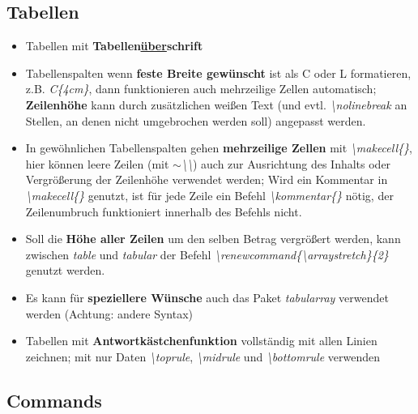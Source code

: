 \documentclass[./main.tex]{subfiles}
\begin{document}
\subsection{Tabellen}
\begin{itemize}
    \item Tabellen mit \textbf{Tabellen\underline{\"uber}schrift}
    \item Tabellenspalten wenn \textbf{feste Breite gew\"unscht} ist als C oder L formatieren, z.B. \textit{C\{4cm\}}, dann funktionieren auch mehrzeilige Zellen automatisch; \textbf{Zeilenh\"ohe} kann durch zus\"atzlichen wei\ss{}en Text (und evtl. \textit{\textbackslash nolinebreak} an Stellen, an denen nicht umgebrochen werden soll) angepasst werden. 
    \item In gew\"ohnlichen Tabellenspalten gehen \textbf{mehrzeilige Zellen} mit \textit{\textbackslash makecell\{\}}, hier k\"onnen leere Zeilen (mit \textit{$\sim$\textbackslash\textbackslash}) auch zur Ausrichtung des Inhalts oder Vergr\"o\ss{}erung der Zeilenh\"ohe verwendet werden; Wird ein Kommentar in \textit{\textbackslash makecell\{\}} genutzt, ist f\"ur jede Zeile ein Befehl \textit{\textbackslash kommentar\{\}} n\"otig, der Zeilenumbruch funktioniert innerhalb des Befehls nicht.
    \item Soll die \textbf{H\"ohe aller Zeilen} um den selben Betrag vergr\"o\ss{}ert werden, kann zwischen \textit{table} und \textit{tabular} der Befehl \textit{\textbackslash renewcommand\{\textbackslash arraystretch\}\{2\}} genutzt werden.
    \item Es kann f\"ur \textbf{speziellere W\"unsche} auch das Paket \textit{tabularray} verwendet werden (Achtung: andere Syntax)
    \item Tabellen mit \textbf{Antwortk\"astchenfunktion} vollst\"andig mit allen Linien zeichnen; mit nur Daten \textit{\hypertarget{toprule}{\textbackslash toprule}}, \textit{\hypertarget{midrule}{\textbackslash midrule}} und \textit{\hypertarget{bottomrule}{\textbackslash bottomrule}} verwenden
\end{itemize}


\pagebreak
\subsection{Commands}
\end{document}
